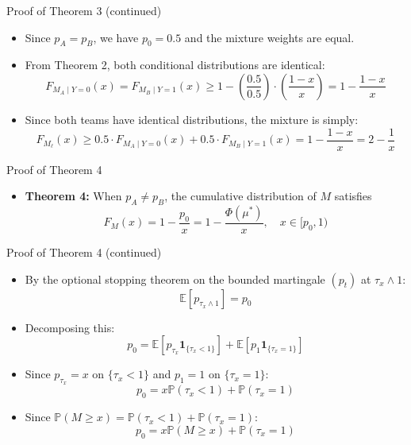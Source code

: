 \documentclass{beamer}
\renewcommand{\P}{\mathbb{P}}
\newcommand{\E}{\mathbb{E}}
\begin{document}
\begin{frame}{Proof of Theorem 3 (continued)}
\begin{itemize}
  \item Since $p_A = p_B$, we have $p_0 = 0.5$ and the mixture weights are equal.
  \item From Theorem 2, both conditional distributions are identical:
  \begin{equation*}
    F_{M_A \mid Y = 0}(x) = F_{M_B \mid Y = 1}(x) \geq 1 - \left(\frac{0.5}{0.5}\right) \cdot \left(\frac{1 - x}{x}\right) = 1 - \frac{1-x}{x}
  \end{equation*}
  \item Since both teams have identical distributions, the mixture is simply:
  \begin{equation*}
    F_{M_\ell}(x) \geq 0.5 \cdot F_{M_A \mid Y = 0}(x) + 0.5 \cdot F_{M_B \mid Y = 1}(x) = 1 - \frac{1-x}{x} = 2 - \frac{1}{x}
  \end{equation*}
\end{itemize}
\end{frame}

\begin{frame}{Proof of Theorem 4}
\begin{itemize}
  \item \textbf{Theorem 4:} When $p_A \neq p_B$, the cumulative distribution of $M$ satisfies
  \begin{equation*}
    F_M(x) = 1 - \frac{p_0}{x} = 1 - \frac{\Phi(\mu^*)}{x}, \quad x \in [p_0, 1)
  \end{equation*}
\end{itemize}
\end{frame}

\begin{frame}{Proof of Theorem 4 (continued)}
\begin{itemize}
  \item By the optional stopping theorem on the bounded martingale $(p_t)$ at $\tau_x \wedge 1$:
  \begin{equation*}
    \E[p_{\tau_x \wedge 1}] = p_0
  \end{equation*}
  \item Decomposing this:
  \begin{equation*}
    p_0 = \E[p_{\tau_x} \boldsymbol{1}_{\{\tau_x < 1\}}] + \E[p_1 \boldsymbol{1}_{\{\tau_x = 1\}}]
  \end{equation*}
  \item Since $p_{\tau_x} = x$ on $\{\tau_x < 1\}$ and $p_1 = 1$ on $\{\tau_x = 1\}$:
  \begin{equation*}
    p_0 = x \P(\tau_x < 1) + \P(\tau_x = 1)
  \end{equation*}
  \item Since $\P(M \geq x) = \P(\tau_x < 1) + \P(\tau_x = 1)$:
  \begin{equation*}
    p_0 = x \P(M \geq x) + \P(\tau_x = 1)
  \end{equation*}
\end{itemize}
\end{frame}
\end{document}
